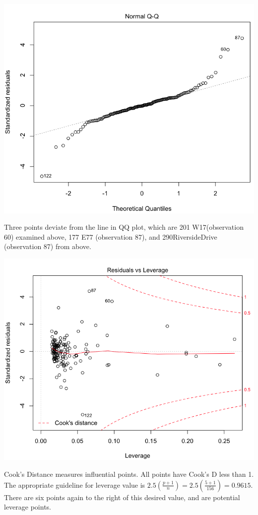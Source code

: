 \documentclass[a4 paper, 11 pt, twocolumn]{article}
\begin{document}
\begin{center}
\includegraphics[scale=0.3]{QQ2}
\end{center}
Three points deviate from the line in QQ plot, which are 201 W17(observation 60) examined above, 177 E77 (observation 87), and 290RiversideDrive (observation 87) from above.

\begin{center}
\includegraphics[scale=0.3]{CooksD2}
\end{center}
Cook's Distance measures influential points. All points have Cook's D less than 1. The appropriate guideline for leverage value is $2.5\left(\frac{p+1}{n}\right) = 2.5\left(\frac{5+1}{156}\right) = 0.9615.$ There are six points again to the right of this desired value, and are potential leverage points.
\end{document}

